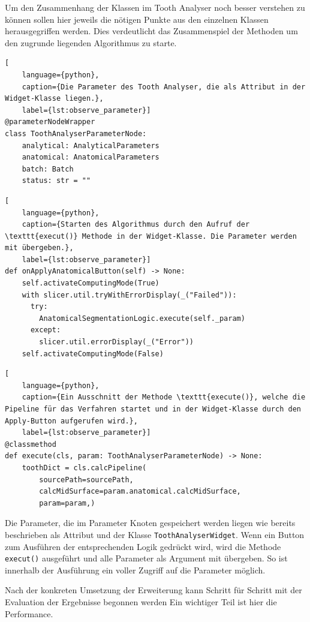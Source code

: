 \pagebreak

Um den Zusammenhang der Klassen im Tooth Analyser noch besser verstehen zu können
sollen hier jeweils die nötigen Punkte aus den einzelnen Klassen herausgegriffen
werden. Dies verdeutlicht das Zusammenspiel der Methoden um den zugrunde
liegenden Algorithmus zu starte.

\begin{lstlisting}[
    language={python},
    caption={Die Parameter des Tooth Analyser, die als Attribut in der Widget-Klasse liegen.},
    label={lst:observe_parameter}]
@parameterNodeWrapper
class ToothAnalyserParameterNode:
    analytical: AnalyticalParameters
    anatomical: AnatomicalParameters
    batch: Batch
    status: str = ""
\end{lstlisting}

\begin{lstlisting}[
    language={python},
    caption={Starten des Algorithmus durch den Aufruf der \texttt{execut()} Methode in der Widget-Klasse. Die Parameter werden mit übergeben.},
    label={lst:observe_parameter}]
def onApplyAnatomicalButton(self) -> None:
    self.activateComputingMode(True)
    with slicer.util.tryWithErrorDisplay(_("Failed")):
	  try:
	    AnatomicalSegmentationLogic.execute(self._param)
	  except:
	    slicer.util.errorDisplay(_("Error"))
    self.activateComputingMode(False)
\end{lstlisting}

\begin{lstlisting}[
    language={python},
    caption={Ein Ausschnitt der Methode \texttt{execute()}, welche die Pipeline für das Verfahren startet und in der Widget-Klasse durch den Apply-Button aufgerufen wird.},
    label={lst:observe_parameter}]
@classmethod
def execute(cls, param: ToothAnalyserParameterNode) -> None:
    toothDict = cls.calcPipeline(
	    sourcePath=sourcePath,
	    calcMidSurface=param.anatomical.calcMidSurface,
	    param=param,)
\end{lstlisting}

Die Parameter, die im Parameter Knoten gespeichert werden liegen wie bereits
beschrieben als Attribut und der Klasse \texttt{ToothAnalyserWidget}. Wenn ein
Button zum Ausführen der entsprechenden Logik gedrückt wird, wird die Methode \texttt{execut()}
ausgeführt und alle Parameter als Argument mit übergeben. So ist innerhalb der Ausführung
ein voller Zugriff auf die Parameter möglich.

Nach der konkreten Umsetzung der Erweiterung kann Schritt für Schritt mit der Evaluation
der Ergebnisse begonnen werden Ein wichtiger Teil ist hier die Performance.

